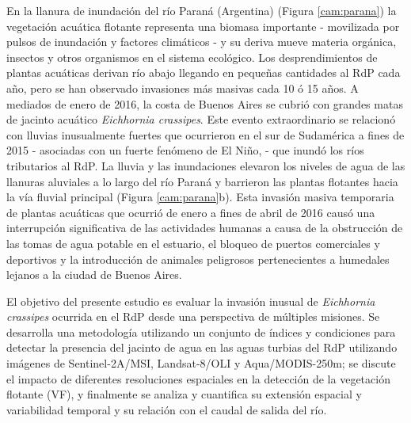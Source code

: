     En la llanura de inundación del río Paraná (Argentina) (Figura \ref{cam:parana}) la vegetación acuática flotante representa una biomasa importante - movilizada por pulsos de inundación y factores climáticos - y su deriva mueve materia orgánica, insectos y otros organismos en el sistema ecológico. Los desprendimientos de plantas acuáticas derivan río abajo llegando en pequeñas cantidades al RdP cada año, pero se han observado invasiones más masivas cada 10 ó 15 años. A mediados de enero de 2016, la costa de Buenos Aires se cubrió con grandes matas de jacinto acuático \textit{Eichhornia crassipes}. Este evento extraordinario se relacionó con lluvias inusualmente fuertes que ocurrieron en el sur de Sudamérica a fines de 2015 - asociadas con un fuerte fenómeno de El Niño, \cite{ropewelski1987}\cite{mason2001} - que inundó los ríos tributarios al RdP. La lluvia y las inundaciones elevaron los niveles de agua de las llanuras aluviales a lo largo del río Paraná y barrieron las plantas flotantes hacia la vía fluvial principal (Figura \ref{cam:parana}b). Esta invasión masiva temporaria de plantas acuáticas que ocurrió de enero a fines de abril de 2016 causó una interrupción significativa de las actividades humanas a causa de la obstrucción de las tomas de agua potable en el estuario, el bloqueo de puertos comerciales y deportivos y la introducción de animales peligrosos pertenecientes a humedales lejanos a la ciudad de Buenos Aires.
    
    El objetivo del presente estudio es evaluar la invasión inusual de \textit{Eichhornia crassipes} ocurrida en el RdP desde una perspectiva de múltiples misiones. Se desarrolla una metodología utilizando un conjunto de índices y condiciones para detectar la presencia del jacinto de agua en las aguas turbias del RdP utilizando imágenes de Sentinel-2A/MSI, Landsat-8/OLI y Aqua/MODIS-250m; se discute el impacto de diferentes resoluciones espaciales en la detección de la vegetación flotante (VF), y finalmente se analiza y cuantifica su extensión espacial y variabilidad temporal y su relación con el caudal de salida del río.
    
